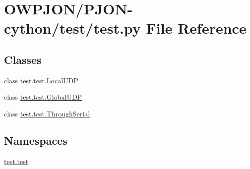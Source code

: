 \hypertarget{PJON-cython_2test_2test_8py}{\section{O\-W\-P\-J\-O\-N/\-P\-J\-O\-N-\/cython/test/test.py File Reference}
\label{PJON-cython_2test_2test_8py}
}
\subsection*{Classes}
\begin{DoxyCompactItemize}
\item 
class \hyperlink{classtest_1_1test_1_1LocalUDP}{test.\-test.\-Local\-U\-D\-P}
\item 
class \hyperlink{classtest_1_1test_1_1GlobalUDP}{test.\-test.\-Global\-U\-D\-P}
\item 
class \hyperlink{classtest_1_1test_1_1ThroughSerial}{test.\-test.\-Through\-Serial}
\end{DoxyCompactItemize}
\subsection*{Namespaces}
\begin{DoxyCompactItemize}
\item 
\hyperlink{namespacetest_1_1test}{test.\-test}
\end{DoxyCompactItemize}
